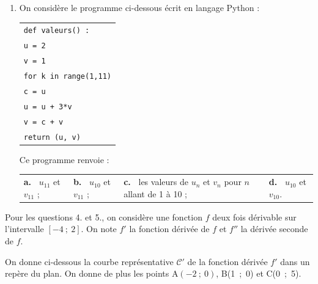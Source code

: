 \begin{enumerate}
\item On considère le programme ci-dessous écrit en langage Python :

\begin{center}
\begin{tabular}{|>{\texttt}l|}\hline
\texttt{def valeurs() :}\\
\quad \texttt{u = 2}\\
\quad \texttt{v = 1}\\
\quad \texttt{for k in range(1,11)}\\
\quad \quad \texttt{c = u}\\
\quad \quad \texttt{u = u + 3*v}\\
\quad \quad \texttt{v = c + v}\\
\quad \texttt{return (u, v)}\\ \hline
\end{tabular}
\end{center}

Ce programme renvoie :

\begin{center}
\begin{tabularx}{\linewidth}{*{4}{X}}
\textbf{a.~} $u_{11}$ et $v_{11}$ ;&
\textbf{b.~} $u_{10}$ et $v_{11}$ ;&
\textbf{c.~} les valeurs de $u_n$ et $v_n$ pour $n$ allant de 1 à 10 ;&
\textbf{d.~} $u_{10}$ et $v_{10}$.
\end{tabularx}
\end{center}
\end{enumerate}

Pour les questions 4. et 5., on considère une fonction $f$ deux fois dérivable sur l'intervalle $[-4~;~2]$. On note $f'$ la fonction dérivée de $f$ et $f''$ la dérivée seconde de $f$.

On donne ci-dessous la courbe représentative $\mathcal{C}'$ de la fonction dérivée $f'$ dans un repère du plan. On donne de plus les points A$(-2~;~0)$, B(1~;~0) et C(0~;~5).

